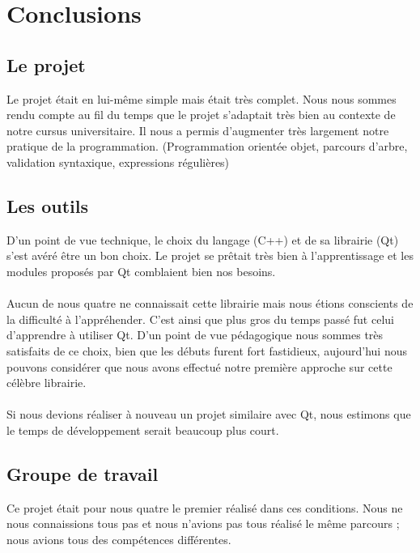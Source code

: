 \section{Conclusions}

\subsection{Le projet}
Le projet était en lui-même simple mais était très complet. Nous nous sommes rendu compte au fil du temps que le projet s'adaptait très bien au contexte de notre cursus universitaire. Il nous a permis d'augmenter très largement notre pratique de la programmation. (Programmation orientée objet, parcours d’arbre, validation syntaxique, expressions régulières)


\subsection{Les outils}
D'un point de vue technique, le choix du langage (C++) et de sa librairie (Qt) s’est avéré être un bon choix. Le projet se prêtait très bien à l’apprentissage et les modules proposés par Qt comblaient bien nos besoins.

\paragraph{}
Aucun de nous quatre ne connaissait cette librairie mais nous étions conscients de la difficulté à l'appréhender. C'est ainsi que plus gros du temps passé fut celui d'apprendre à utiliser Qt. D'un point de vue pédagogique nous sommes très satisfaits de ce choix, bien que les débuts furent fort fastidieux, aujourd'hui nous pouvons considérer que nous avons effectué notre première approche sur cette célèbre librairie.
\paragraph{}

Si nous devions réaliser à nouveau un projet similaire avec Qt, nous estimons que le temps de développement serait beaucoup plus court.

\subsection{Groupe de travail}
Ce projet était pour nous quatre le premier réalisé dans ces conditions. Nous ne nous connaissions tous pas et nous n'avions pas tous réalisé le même parcours ; nous avions tous des compétences différentes.
